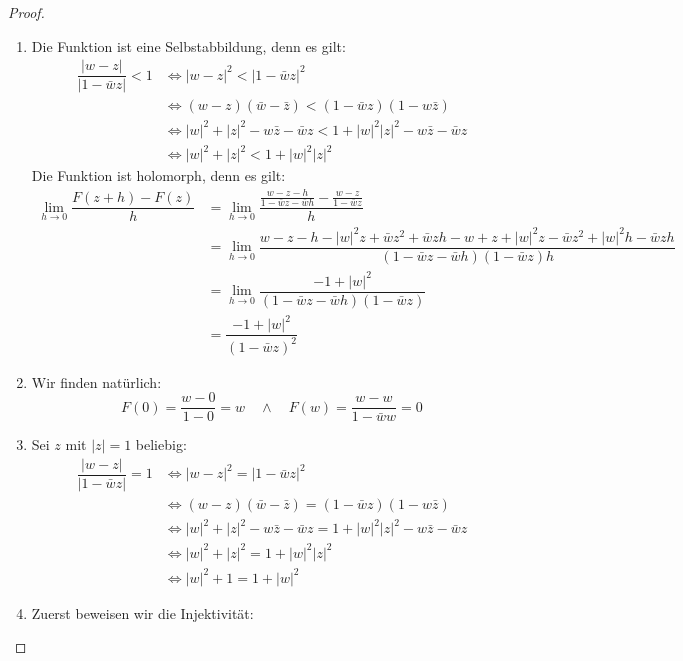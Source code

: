 \documentclass[11pt]{article}
\begin{document}
    \begin{proof}
        \begin{enumerate}[label=(\alph*)]
            \item Die Funktion ist eine Selbstabbildung, denn es gilt:
            $$\begin{aligned}
                  \dfrac{|w-z|}{|1-\bar{w}z|}<1&\Leftrightarrow |w-z|^2<|1-\bar{w}z|^2\\
                  &\Leftrightarrow (w-z)(\bar{w}-\bar{z}) < (1-\bar{w}z)(1-w\bar{z})\\
                  &\Leftrightarrow |w|^2+|z|^2-w\bar{z}-\bar{w}z < 1+|w|^2|z|^2-w\bar{z}-\bar{w}z\\
                  &\Leftrightarrow |w|^2+|z|^2 < 1+|w|^2|z|^2
            \end{aligned}$$
            Die Funktion ist holomorph, denn es gilt:
            $$\begin{aligned}
                  \lim_{h\to 0}\dfrac{F(z+h)-F(z)}{h} &= \lim_{h\to 0}\dfrac{\frac{w-z-h}{1-\bar{w}z-\bar{w}h}
                  -\frac{w-z}{1-\bar{w}z}}{h} \\
                  &= \lim_{h\to 0}\dfrac{w-z-h-|w|^2z+\bar{w}z^2+\bar{w}zh-w+z+|w|^2z-\bar{w}z^2+|w|^2h-\bar{w}zh}
                  {(1-\bar{w}z-\bar{w}h)(1-\bar{w}z)h}\\
                  &= \lim_{h\to 0}\dfrac{-1+|w|^2}{(1-\bar{w}z-\bar{w}h)(1-\bar{w}z)}\\
                  &= \dfrac{-1+|w|^2}{(1-\bar{w}z)^2}
            \end{aligned}$$
            \item Wir finden natürlich:
            $$F(0) = \dfrac{w-0}{1-0}=w\quad \land\quad F(w) = \dfrac{w-w}{1-\bar{w}w}=0$$
            \item Sei $z$ mit $|z|=1$ beliebig:
            $$\begin{aligned}
                  \dfrac{|w-z|}{|1-\bar{w}z|}=1&\Leftrightarrow |w-z|^2=|1-\bar{w}z|^2\\
                  &\Leftrightarrow (w-z)(\bar{w}-\bar{z}) = (1-\bar{w}z)(1-w\bar{z})\\
                  &\Leftrightarrow |w|^2+|z|^2-w\bar{z}-\bar{w}z = 1+|w|^2|z|^2-w\bar{z}-\bar{w}z\\
                  &\Leftrightarrow |w|^2+|z|^2 = 1+|w|^2|z|^2\\
                  &\Leftrightarrow |w|^2+1=1+|w|^2
            \end{aligned}$$
            \item Zuerst beweisen wir die Injektivität:

\end{enumerate}
\end{proof}
\end{document}
